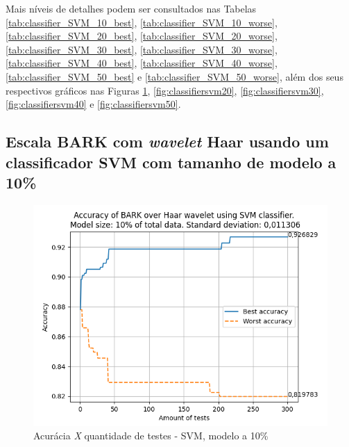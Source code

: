 		\par Mais níveis de detalhes podem ser consultados nas Tabelas \ref{tab:classifier_SVM_10_best}, \ref{tab:classifier_SVM_10_worse}, \ref{tab:classifier_SVM_20_best}, \ref{tab:classifier_SVM_20_worse}, \ref{tab:classifier_SVM_30_best}, \ref{tab:classifier_SVM_30_worse}, \ref{tab:classifier_SVM_40_best}, \ref{tab:classifier_SVM_40_worse}, \ref{tab:classifier_SVM_50_best} e \ref{tab:classifier_SVM_50_worse}, além dos seus respectivos gráficos nas Figuras \ref{fig:classifiersvm10}, \ref{fig:classifiersvm20}, \ref{fig:classifiersvm30}, \ref{fig:classifiersvm40} e \ref{fig:classifiersvm50}.

		
	
		\newpage
		\subsection{Escala BARK com \textit{wavelet} Haar usando um classificador SVM com tamanho de modelo a 10\%}
			\begin{figure}[ht]
				\centering
				\includegraphics{images/results/confusionMatrices/classifier_SVM_10.png}
				\caption{Acurácia \textit{X} quantidade de testes - SVM, modelo a 10\%}
				\label{fig:classifiersvm10}
			\end{figure}
			
	
		\newpage
